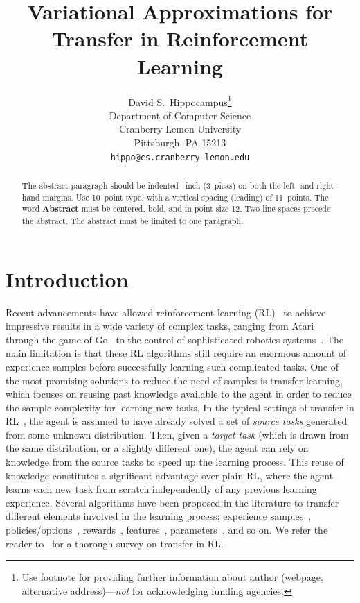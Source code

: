 \documentclass{article}
\title{Variational Approximations for Transfer in Reinforcement Learning}
\author{
  David S.~Hippocampus\thanks{Use footnote for providing further
    information about author (webpage, alternative
    address)---\emph{not} for acknowledging funding agencies.} \\
  Department of Computer Science\\
  Cranberry-Lemon University\\
  Pittsburgh, PA 15213 \\
  \texttt{hippo@cs.cranberry-lemon.edu} \\
}
\begin{document}

\maketitle

\begin{abstract}
  The abstract paragraph should be indented ~inch
  (3~picas) on both the left- and right-hand margins. Use 10~point
  type, with a vertical spacing (leading) of 11~points.  The word
  \textbf{Abstract} must be centered, bold, and in point size 12. Two
  line spaces precede the abstract. The abstract must be limited to
  one paragraph.
\end{abstract}

\section{Introduction}

Recent advancements have allowed reinforcement learning (RL)~\cite{sutton1998reinforcement} to achieve impressive results in a wide variety of complex tasks, ranging from Atari~\cite{mnih2015human} through the game of Go~\cite{silver2016mastering} to the control of sophisticated robotics systems~\cite{kober2009policy,lillicrap2015continuous,levine2016end}. The main limitation is that these RL algorithms still require an enormous amount of experience samples before successfully learning such complicated tasks. One of the most promising solutions to reduce the need of samples is transfer learning, which focuses on reusing past knowledge available to the agent in order to reduce the sample-complexity for learning new tasks. In the typical settings of transfer in RL~\cite{taylor2009transfer}, the agent is assumed to have already solved a set of \textit{source tasks} generated from some unknown distribution. Then, given a \textit{target task} (which is drawn from the same distribution, or a slightly different one), the agent can rely on knowledge from the source tasks to speed up the learning process. This reuse of knowledge constitutes a significant advantage over plain RL, where the agent learns each new task from scratch independently of any previous learning experience. Several algorithms have been proposed in the literature to transfer different elements involved in the learning process: experience samples~\cite{lazaric2008transfer,taylor2008transferring}, policies/options~\cite{fernandez2006probabilistic,konidaris2007building}, rewards~\cite{konidaris2006autonomous}, features~\cite{barreto2017successor}, parameters~\cite{doshi2016hidden,killian2017robust}, and so on. We refer the reader to~\cite{taylor2009transfer,lazaric2012transfer} for a thorough survey on transfer in RL.
\end{document}
